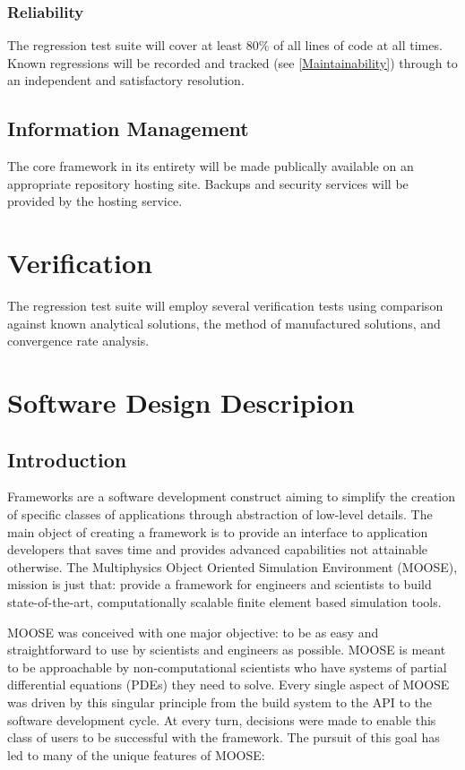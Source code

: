 \documentclass{INLreport}
\begin{document}
\subsubsection{Reliability}
The regression test suite will cover at least 80\% of all lines of code at all times. Known regressions will be recorded
and tracked (see \ref{Maintainability}) through to an independent and satisfactory resolution.

\subsection{Information Management}
The core framework in its entirety will be made publically available on an appropriate repository hosting site. Backups and
security services will be provided by the hosting service.

\section{Verification}

The regression test suite will employ several verification tests using comparison against known analytical solutions, the method of
manufactured solutions, and convergence rate analysis.


\section{Software Design Descripion}

\subsection{Introduction}
Frameworks are a software development construct aiming to simplify the creation of specific classes of applications
through abstraction of low-level details. The main object of creating a framework is to provide an interface to
application developers that saves time and provides advanced capabilities not attainable otherwise. The Multiphysics
Object Oriented Simulation Environment (MOOSE), mission is just that: provide a framework for engineers and scientists
to build state-of-the-art, computationally scalable finite element based simulation tools.

MOOSE was conceived with one major objective: to be as easy and straightforward to use by scientists and engineers as possible.
MOOSE is meant to be approachable by non-computational scientists who have systems of partial differential equations (PDEs) they need to solve. Every single aspect of MOOSE was driven by this singular principle from the build system to the API to the software development cycle.  At every turn, decisions were made to enable this class of users to be successful with the framework.  The pursuit of this goal has led to many of the unique features of MOOSE:
\end{document}
